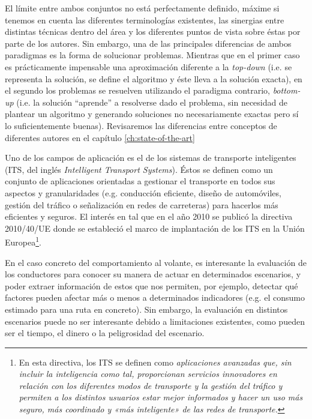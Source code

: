 El límite entre ambos conjuntos no está perfectamente definido, máxime si tenemos en cuenta las diferentes terminologías existentes, las sinergias entre distintas técnicas dentro del área y los diferentes puntos de vista sobre éstas por parte de los autores. Sin embargo, una de las principales diferencias de ambos paradigmas es la forma de solucionar problemas. Mientras que en el primer caso es prácticamente impensable una aproximación diferente a la \textit{top-down} (i.e. se representa la solución, se define el algoritmo y éste lleva a la solución exacta), en el segundo los problemas se resuelven utilizando el paradigma contrario, \textit{bottom-up} (i.e. la solución \enquote{aprende} a resolverse dado el problema, sin necesidad de plantear un algoritmo y generando soluciones no necesariamente exactas pero sí lo suficientemente buenas). Revisaremos las diferencias entre conceptos de diferentes autores en el capítulo \ref{ch:state-of-the-art}

Uno de los campos de aplicación es el de los sistemas de transporte inteligentes (ITS, del inglés \textit{Intelligent Transport Systems}). Éstos se definen como un conjunto de aplicaciones orientadas a gestionar el transporte en todos sus aspectos y granularidades (e.g. conducción eficiente, diseño de automóviles, gestión del tráfico o señalización en redes de carreteras) para hacerlos más eficientes y seguros. El interés en tal que en el año 2010 se publicó la directiva 2010/40/UE\cite{parliament2010directive} donde se estableció el marco de implantación de los ITS en la Unión Europea\footnote{En esta directiva, los ITS se definen como \textit{aplicaciones avanzadas que, sin incluir la inteligencia como tal, proporcionan servicios innovadores en relación con los diferentes modos de transporte y la gestión del tráfico y permiten a los distintos usuarios estar mejor informados y hacer un uso más seguro, más coordinado y «más inteligente» de las redes de transporte.}}.

En el caso concreto del comportamiento al volante, es interesante la evaluación de los conductores para conocer su manera de actuar en determinados escenarios, y poder extraer información de estos que nos permiten, por ejemplo, detectar qué factores pueden afectar más o menos a determinados indicadores (e.g. el consumo estimado para una ruta en concreto). Sin embargo, la evaluación en distintos escenarios puede no ser interesante debido a limitaciones existentes, como pueden ser el tiempo, el dinero o la peligrosidad del escenario.

